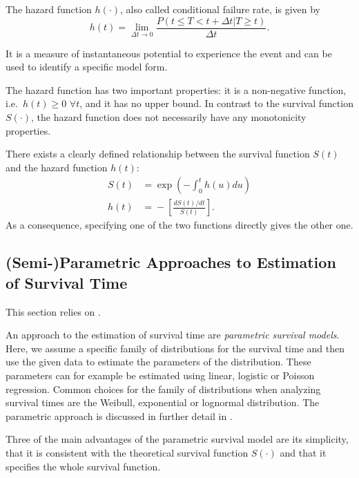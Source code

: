 \documentclass[12pt, a4paper]{scrartcl}
\theoremstyle{definition}
\theoremstyle{plain}
\numberwithin{equation}{section}
\numberwithin{figure}{section}
\numberwithin{table}{section}
\begin{document}
	The hazard function $h(\cdot)$, also called conditional failure rate, is given by
	\begin{equation*}
		h(t) = \lim_{\Delta t \to 0}\frac{P(t \leq T < t + \Delta t \vert T \geq t)}{\Delta t}.
	\end{equation*} 
	
	It is a measure of instantaneous potential to experience the event and can be used to identify a specific model form.
	
	The hazard function has two important properties: it is a non-negative function, i.e.~$h(t) \geq 0$ $ \forall t$, and it has no upper bound.
	In contrast to the survival function $S(\cdot)$, the hazard function does not necessarily have any monotonicity properties.

	There exists a clearly defined relationship between the survival function $S(t)$ and the hazard function $h(t)$:
	\begin{equation*}
	\begin{split}
		S(t) &={} \exp \left( - \int_{0}^{t}h(u)du\right) \\
		h(t) & ={} - \left[ \frac{dS(t)/dt}{S(t)}\right].
	\end{split}
	\end{equation*}
	As a consequence, specifying one of the two functions directly gives the other one.
	
	
	
	\subsection{(Semi-)Parametric Approaches to Estimation of Survival Time} \label{cox}

	This section relies on \citet*{sabook}.
	
	An approach to the estimation of survival time are \emph{parametric survival models}.
	Here, we assume a specific family of distributions for the survival time and then use the given data to estimate the parameters of the distribution.
	These parameters can for example be estimated using linear, logistic or Poisson regression.
	Common choices for the family of distributions when analyzing survival times are the Weibull, exponential or lognormal distribution.
	The parametric approach is discussed in further detail in \citet*{sabook}.
	
	Three of the main advantages of the parametric survival model are its simplicity,  that it is consistent with the theoretical survival function $S(\cdot)$ and that it specifies the whole survival function.
	
\end{document}
